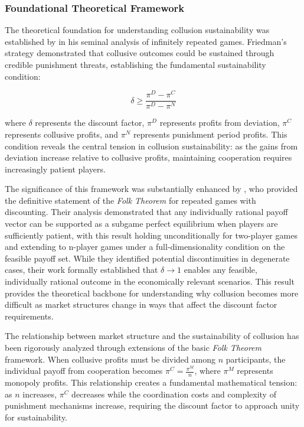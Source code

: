 \subsubsection*{Foundational Theoretical Framework}

The theoretical foundation for understanding collusion sustainability was established by \textcite{friedman_non-cooperative_1971} in his seminal analysis of infinitely repeated games. Friedman's  strategy demonstrated that collusive outcomes could be sustained through credible punishment threats, establishing the fundamental sustainability condition:

\begin{equation}
    \delta \geq \frac{\pi^{D} - \pi^{C}}{\pi^{D} - \pi^{N}}
\end{equation}

where $\delta$ represents the discount factor, $\pi^{D}$ represents profits from deviation, $\pi^{C}$ represents collusive profits, and $\pi^{N}$ represents punishment period profits. This condition reveals the central tension in collusion sustainability: as the gains from deviation increase relative to collusive profits, maintaining cooperation requires increasingly patient players.

The significance of this framework was substantially enhanced by \textcite{fudenberg_folk_1986}, who provided the definitive statement of the \emph{Folk Theorem} for repeated games with discounting. Their analysis demonstrated that any individually rational payoff vector can be supported as a subgame perfect equilibrium when players are sufficiently patient, with this result holding unconditionally for two-player games and extending to n-player games under a full-dimensionality condition on the feasible payoff set. While they identified potential discontinuities in degenerate cases, their work formally established that $\delta \rightarrow 1$ enables any feasible, individually rational outcome in the economically relevant scenarios. This result provides the theoretical backbone for understanding why collusion becomes more difficult as market structures change in ways that affect the discount factor requirements.

The relationship between market structure and the sustainability of collusion has been rigorously analyzed through extensions of the basic \emph{Folk Theorem} framework. When collusive profits must be divided among $n$ participants, the individual payoff from cooperation becomes $\pi^C = \frac{\pi^M}{n}$, where $\pi^M$ represents monopoly profits. This relationship creates a fundamental mathematical tension: as $n$ increases, $\pi^C$ decreases while the coordination costs and complexity of punishment mechanisms increase, requiring the discount factor to approach unity for sustainability.

